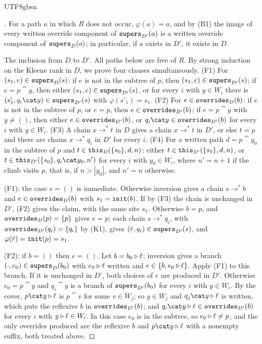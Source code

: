 \begin{CJK*}{UTF8}{gbsn}
\begin{proof}[]
\begin{sloppypar}
For a path $a$ in which $R$ does not occur, $\varphi(a) = a$, and by (B1) the image of every written
override component of $\mathtt{supers}_{D'}(a)$ is a written override component of $\mathtt{supers}_D(a)$; in
particular, if $a$ exists in $D'$, it exists in $D$.

The inclusion from $D$ to $D'$. All paths below are free of $R$. By strong induction on the Kleene rank in
$D$, we prove four clauses simultaneously.
(F1) For $(s_1, e) \in \mathtt{supers}_D(s)$: if $e$ is not in the subtree of $p$, then
$(s_1, e) \in \mathtt{supers}_{D'}(s)$; if $e = p \cat y$, then either $(s_1, e) \in \mathtt{supers}_{D'}(s)$, or for every
$i$ with $y \in W_i$ there is $(s'_1, q_i \cat y) \in \supers_{D'}(s)$ with $\varphi(s'_1) = s_1$.
(F2) For $e \in \mathtt{overrides}_D(b)$: if $e$ is not in the subtree of $p$, or $e = p$, then
$e \in \mathtt{overrides}_{D'}(b)$; if $e = p \cat y$ with $y \ne ()$, then either $e \in \mathtt{overrides}_{D'}(b)$, or
$q_i \cat y \in \overrides_{D'}(b)$ for every $i$ with $y \in W_i$.
(F3) A chain $x \to^* t$ in $D$ gives a chain $x \to^* t$ in $D'$, or else $t = p$ and there are chains
$x \to^* q_i$ in $D'$ for every $i$.
(F4) For a written path $d = p \cat y_0$ in the subtree of $p$ and $t \in \mathtt{this}_D(\{s_0\}, d, n)$: either
$t \in \mathtt{this}_{D'}(\{s_0\}, d, n)$, or $t \in \this_{D'}(\{s_0\}, q_i \cat y_0, n')$ for every $i$ with
$y_0 \in W_i$, where $n' = n + 1$ if the climb visits $p$, that is, if $n > |y_0|$, and $n' = n$
otherwise.

(F1): the case $s = ()$ is immediate. Otherwise inversion gives a chain $s \to^* b$ and
$e \in \mathtt{overrides}_D(b)$ with $s_1 = \mathtt{init}(b)$. If by (F3) the chain is unchanged in $D'$, (F2) gives the
claim, with the same site $s_1$. Otherwise $b = p$, and $\mathtt{overrides}_D(p) = \{p\}$ gives $e = p$; each
chain $s \to^* q_i$, with $\mathtt{overrides}_{D'}(q_i) = \{q_i\}$ by (K1), gives
$(\bar r, q_i) \in \mathtt{supers}_{D'}(s)$, and $\varphi(\bar r) = \mathtt{init}(p) = s_1$.

(F2): if $b = ()$ then $e = ()$. Let $b = b_0 \mathbin{\triangleright} \ell$; inversion gives a branch
$(\cdot, e_0) \in \mathtt{supers}_D(b_0)$ with $e_0 \mathbin{\triangleright} \ell$ written and $e \in \{b, e_0 \mathbin{\triangleright} \ell\}$. Apply
(F1) to this branch. If it is unchanged in $D'$, both choices of $e$ are produced in $D'$. Otherwise
$e_0 = p \cat y$ and $q_i \cat y$ is a branch of $\mathtt{supers}_{D'}(b_0)$ for every $i$ with $y \in W_i$. By
the cover, $p \cat y \snoc \ell$ is $p \cat v$ for some $v \in W_j$; so $y \in W_j$ and
$q_j \cat y \snoc \ell$ is written, which puts the reflexive $b$ in $\mathtt{overrides}_{D'}(b)$; and
$q_i \cat y \snoc \ell \in \overrides_{D'}(b)$ for every $i$ with $y \mathbin{\triangleright} \ell \in W_i$. In this case $e_0$ is in the subtree, so
$e_0 \mathbin{\triangleright} \ell \ne p$, and the only overrides produced are the reflexive $b$ and $p \cat y \snoc \ell$
with a nonempty suffix, both treated above.


\end{sloppypar}
\end{proof}
\end{CJK*}
